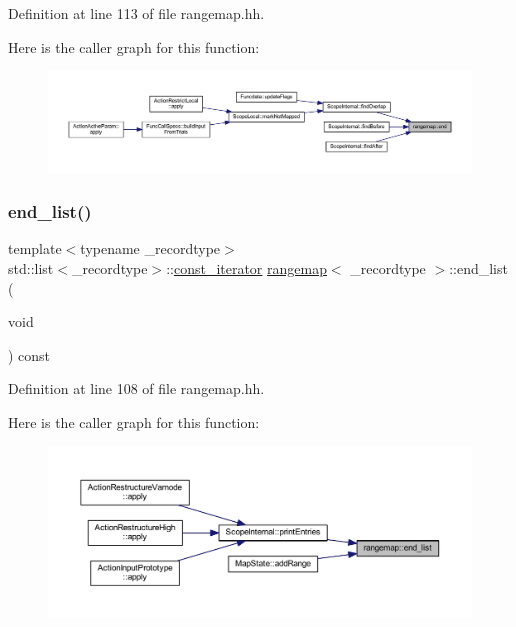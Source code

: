 Definition at line 113 of file rangemap.\+hh.

Here is the caller graph for this function\+:
\nopagebreak
\begin{figure}[H]
\begin{center}
\leavevmode
\includegraphics[width=350pt]{classrangemap_a94d0670391a58a9f30031801c4eeff49_icgraph}
\end{center}
\end{figure}
\mbox{\label{classrangemap_af3abc0a8d0c173ce01ed92f60b639462}} 
\subsubsection{\texorpdfstring{end\_list()}{end\_list()}\hspace{0.1cm}{\footnotesize\ttfamily [1/2]}}
{\footnotesize\ttfamily template$<$typename \+\_\+recordtype$>$ \\
std\+::list$<$\+\_\+recordtype$>$\+::\mbox{\hyperlink{classrangemap_affa7462e68d053d3a066fe0b8d46a99d}{const\+\_\+iterator}} \mbox{\hyperlink{classrangemap}{rangemap}}$<$ \+\_\+recordtype $>$\+::end\+\_\+list (\begin{DoxyParamCaption}\item[{void}]{ }\end{DoxyParamCaption}) const\hspace{0.3cm}{\ttfamily [inline]}}



Definition at line 108 of file rangemap.\+hh.

Here is the caller graph for this function\+:
\nopagebreak
\begin{figure}[H]
\begin{center}
\leavevmode
\includegraphics[width=350pt]{classrangemap_af3abc0a8d0c173ce01ed92f60b639462_icgraph}
\end{center}
\end{figure}
\mbox{\label{classrangemap_aaba1aa6af1a8eebaa1d4c915d0b59d21}} 
